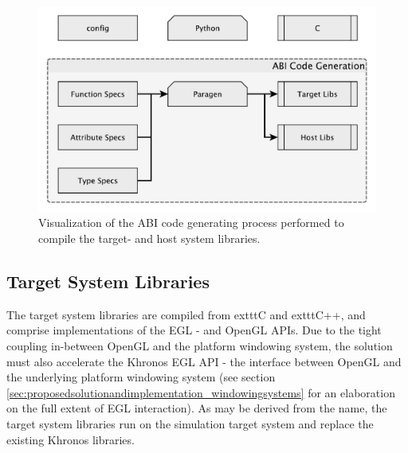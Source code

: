 \begin{figure}
  \centering
  \includegraphics[width=\linewidth]{img/yedabigeneration.pdf}
  \caption[The ABI code generation process]{Visualization of the ABI code generating process performed to compile the target- and host system libraries.}
  \label{fig:abigeneration}
\end{figure}

\subsection{Target System Libraries}
\label{sec:proposedsolutionandimplementation_targetsystemlibraries}
The target system libraries are compiled from 	exttt{C} and 	exttt{C++}, and comprise implementations of the EGL - and OpenGL APIs.
Due to the tight coupling in-between OpenGL and the platform windowing system, the solution must also accelerate the Khronos EGL API - the interface between OpenGL and the underlying platform windowing system (see section \ref{sec:proposedsolutionandimplementation_windowingsystems} for an elaboration on the full extent of EGL interaction).
As may be derived from the name, the target system libraries run on the simulation target system and replace the existing Khronos libraries.

